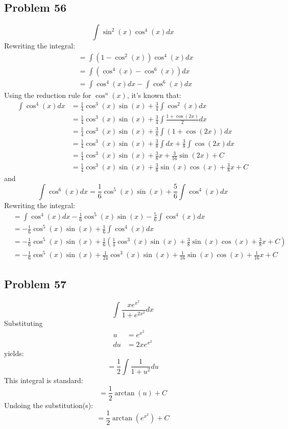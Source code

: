 \documentclass{article}
\begin{document}
\subsection*{Problem 56}
$$\int\sin^2\left(x\right)\cos^4\left(x\right)dx$$
Rewriting the integral:
\begin{align*}
&=\int(1-\cos^2(x))\cos^4(x)dx \\
&=\int(\cos^4(x)-\cos^6(x))dx \\
&=\int\cos^4(x)dx-\int\cos^6(x)dx
\end{align*}
Using the reduction rule for $\cos^n(x)$, it's known that:
\begin{align*}
\int\cos^4(x)dx&=\frac{1}{4}\cos^3(x)\sin(x)+\frac{3}{4}\int\cos^2(x)dx \\
&=\frac{1}{4}\cos^3(x)\sin(x)+\frac{3}{4}\int\frac{1+\cos(2x)}{2}dx \\
&=\frac{1}{4}\cos^3(x)\sin(x)+\frac{3}{8}\int(1+\cos(2x))dx \\
&=\frac{1}{4}\cos^3(x)\sin(x)+\frac{3}{8}\int dx+\frac{3}{8}\int\cos(2x)dx \\
&=\frac{1}{4}\cos^3(x)\sin(x)+\frac{3}{8}x+\frac{3}{16}\sin(2x)+C \\
&=\frac{1}{4}\cos^3(x)\sin(x)+\frac{3}{8}\sin(x)\cos(x)+\frac{3}{8}x+C
\end{align*}
and
$$\int\cos^6(x)dx=\frac{1}{6}\cos^5(x)\sin(x)+\frac{5}{6}\int\cos^4(x)dx$$
Rewriting the integral:
\begin{align*}
&=\int\cos^4(x)dx-\frac{1}{6}\cos^5(x)\sin(x)-\frac{5}{6}\int\cos^4(x)dx \\
&=-\frac{1}{6}\cos^5(x)\sin(x)+\frac{1}{6}\int\cos^4(x)dx \\
&=-\frac{1}{6}\cos^5(x)\sin(x)+\frac{1}{6}\left(\frac{1}{4}\cos^3(x)\sin(x)+\frac{3}{8}\sin(x)\cos(x)+\frac{3}{8}x+C\right) \\
&=-\frac{1}{6}\cos^5(x)\sin(x)+\frac{1}{24}\cos^3(x)\sin(x)+\frac{1}{16}\sin(x)\cos(x)+\frac{1}{16}x+C
\end{align*}
\subsection*{Problem 57}
$$\int\frac{xe^{x^2}}{1+e^{2x^2}}dx$$
Substituting
\begin{align*}
u&=e^{x^2} \\
du&=2xe^{x^2}
\end{align*}
yields:
$$=\frac{1}{2}\int\frac{1}{1+u^2}du$$
This integral is standard:
$$=\frac{1}{2}\arctan(u)+C$$
Undoing the substitution(s):
$$=\frac{1}{2}\arctan\left(e^{x^{2}}\right)+C$$
\end{document}
